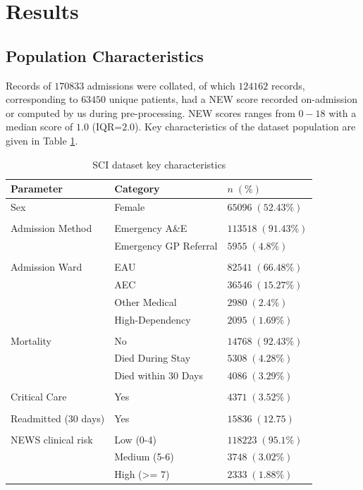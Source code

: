 \documentclass[10pt,journal,compsoc]{IEEEtran}
\begin{document}
\section{Results}
\subsection{Population Characteristics} Records of $170833$ admissions were collated, of which $124162$ records, corresponding to $63450$ unique patients, had a NEW score recorded on-admission or computed by us during pre-processing. NEW scores ranges from $0-18$ with a median score of $1.0$ (IQR=$2.0$). Key characteristics of the dataset population are given in Table \ref{tab:population}.

\begin{table}[!t]
    \renewcommand{\arraystretch}{1.3}
    \centering
    \caption{SCI dataset key characteristics}
    \label{tab:population}
    \begin{tabular}{l l l}
        \hline\hline
        Parameter            & Category              & $n\;(\%)$           \\
        \hline
        Sex                  & Female                & $65096\;(52.43\%)$  \\\\
        Admission Method     & Emergency A\&E        & $113518\;(91.43\%)$ \\
                             & Emergency GP Referral & $5955\;(4.8\%)$     \\\\
        Admission Ward       & EAU                   & $82541\;(66.48\%)$  \\
                             & AEC                   & $36546\;(15.27\%)$  \\
                             & Other Medical         & $2980\;(2.4\%)$     \\
                             & High-Dependency       & $2095\;(1.69\%)$    \\\\
        Mortality            & No                    & $14768\;(92.43\%)$  \\
                             & Died During Stay      & $5308\;(4.28\%)$    \\
                             & Died within 30 Days   & $4086\;(3.29\%)$    \\\\
        Critical Care        & Yes                   & $4371\;(3.52\%)$    \\\\
        Readmitted (30 days) & Yes                   & $15836\;(12.75)$    \\\\
        NEWS clinical risk   & Low (0-4)             & $118223\;(95.1\%)$  \\
                             & Medium (5-6)          & $3748\;(3.02\%)$    \\
                             & High (>= 7)           & $2333\;(1.88\%)$    \\
        \hline\hline
    \end{tabular}
\end{table}
\end{document}
